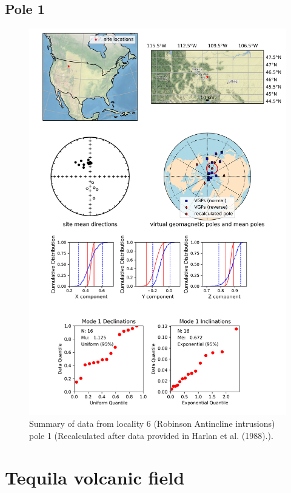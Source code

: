 \subsection{Pole 1}


\begin{figure}[H]
\centering
\includegraphics[width=5 in]{./6/1/pole_summary.png}
\caption{Summary of data from locality 6 (Robinson Antincline intrusions) pole 1 (Recalculated after data provided in Harlan et al. (1988).).}
\end{figure}

\section{Tequila volcanic field}
